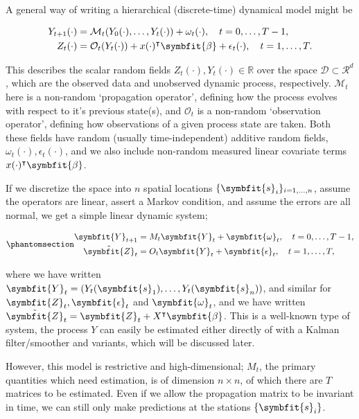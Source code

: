 \documentclass[
]{report}
\newcommand{\bv}[1]{\symbfit{#1}}
\theoremstyle{plain}
\theoremstyle{plain}
\theoremstyle{remark}
\begin{document}
A general way of writing a hierarchical (discrete-time) dynamical model
might be

\[\begin{split}
Y_{t+1}(\cdot) &= \mathcal M_t(Y_0(\cdot), \dots, Y_t(\cdot)) + \omega_t(\cdot), \quad t=0, \dots, T-1,\\
Z_t(\cdot) &= \mathcal O_t(Y_t(\cdot)) + x(\cdot)^{\intercal}\bv \beta + \epsilon_t(\cdot), \quad t=1,\dots,T.
\end{split}
\]

This describes the scalar random fields
\(Z_t(\cdot), Y_t(\cdot)\in \mathbb R\) over the space
\(\mathcal D\subset \mathcal R^d\), which are the observed data and
unobserved dynamic process, respectively. \(\mathcal M_t\) here is a
non-random `propagation operator', defining how the process evolves with
respect to it's previous state(s), and \(\mathcal O_t\) is a non-random
`observation operator', defining how observations of a given process
state are taken. Both these fields have random (usually
time-independent) additive random fields,
\(\omega_t(\cdot), \epsilon_t(\cdot)\), and we also include non-random
measured linear covariate terms \(x(\cdot)^{\intercal}\bv \beta\).

If we discretize the space into \(n\) spatial locations
\(\{\bv s_i\}_{i=1,\dots, n}\), assume the operators are linear, assert
a Markov condition, and assume the errors are all normal, we get a
simple linear dynamic system;

\begin{equation}\phantomsection\label{eq-ldstm}{\begin{split}
\bv Y_{t+1} &= M_t\bv Y_t + \bv \omega_t, \quad t=0, \dots, T-1,\\
\tilde{\bv Z}_t &= O_t\bv Y_t + \bv \epsilon_t, \quad t=1,\dots,T,
\end{split}
}\end{equation}

where we have written \(\bv Y_t = (Y_t(\bv s_1),\dots, Y_t(\bv s_n))\),
and similar for \(\bv Z_t, \bv \epsilon_t\) and \(\bv\omega_t\), and we
have written \(\tilde{\bv Z}_t = \bv Z_t + X^{\intercal}\bv \beta\).
This is a well-known type of system, the process \(Y\) can easily be
estimated either directly of with a Kalman filter/smoother and variants,
which will be discussed later.

However, this model is restrictive and high-dimensional; \(M_t\), the
primary quantities which need estimation, is of dimension \(n\times n\),
of which there are \(T\) matrices to be estimated. Even if we allow the
propagation matrix to be invariant in time, we can still only make
predictions at the stations \(\{\bv s_i\}\).
\end{document}
